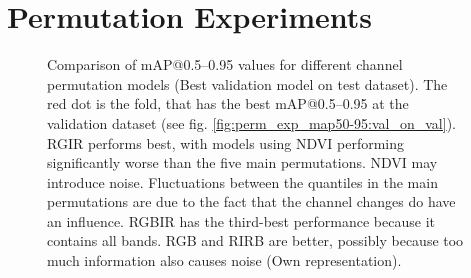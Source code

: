 








\FloatBarrier

\section{Permutation Experiments}
\begin{figure}[t]
    \centering
    
    \caption[Comparison of \acrshort{mAP}@0.5--0.95 values for different channel permutation models (Best validation model on test dataset)]{Comparison of \acrshort{mAP}@0.5--0.95 values for different channel permutation models (Best validation model on test dataset). The red dot is the fold, that has the best \acrshort{mAP}@0.5--0.95 at the validation dataset (see fig. \ref{fig:perm_exp_map50-95:val_on_val}). \acrshort{RGIR} performs best, with models using \acrshort{NDVI} performing significantly worse than the five main permutations. \acrshort{NDVI} may introduce noise. Fluctuations between the quantiles in the main permutations are due to the fact that the channel changes do have an influence. \acrshort{RGBIR} has the third-best performance because it contains all bands. \acrshort{RGB} and \acrshort{RIRB} are better, possibly because too much information also causes noise (Own representation).}
    \label{fig:perm_exp_map50-95:val_on_test}
\end{figure}

